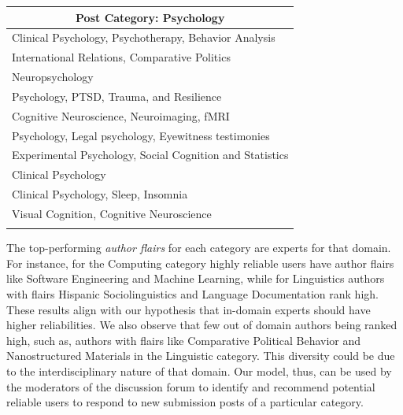 \begin{spacing}{1}
\begin{longtable}{l}
\multicolumn{1}{c}{{Post Category: Psychology}} \\ \hline
Clinical Psychology, Psychotherapy, Behavior Analysis  \\
International Relations, Comparative Politics  \\
Neuropsychology \\
Psychology, PTSD, Trauma, and Resilience  \\
Cognitive Neuroscience, Neuroimaging, fMRI  \\
Psychology, Legal psychology, Eyewitness testimonies   \\
Experimental Psychology, Social Cognition and Statistics  \\
Clinical Psychology   \\
Clinical Psychology, Sleep, Insomnia \\
Visual Cognition, Cognitive Neuroscience  \\
\bottomrule
\label{tab:modelAlignment2}
\end{longtable}
\end{spacing}

The top-performing \emph{author flairs} for each category are experts for that domain.
For instance, for the Computing category highly reliable users have author flairs like Software Engineering and Machine Learning, while for Linguistics authors with flairs Hispanic Sociolinguistics and Language Documentation rank high. These results align with our hypothesis that in-domain experts should have higher reliabilities.
We also observe that few out of domain authors being ranked high, such as, authors with flairs like Comparative Political Behavior and Nanostructured Materials in the Linguistic category. This diversity could be due to the interdisciplinary nature of that domain.
Our model, thus, can be used by the moderators of the discussion forum to identify and recommend potential reliable users to respond to new submission posts of a particular category.

